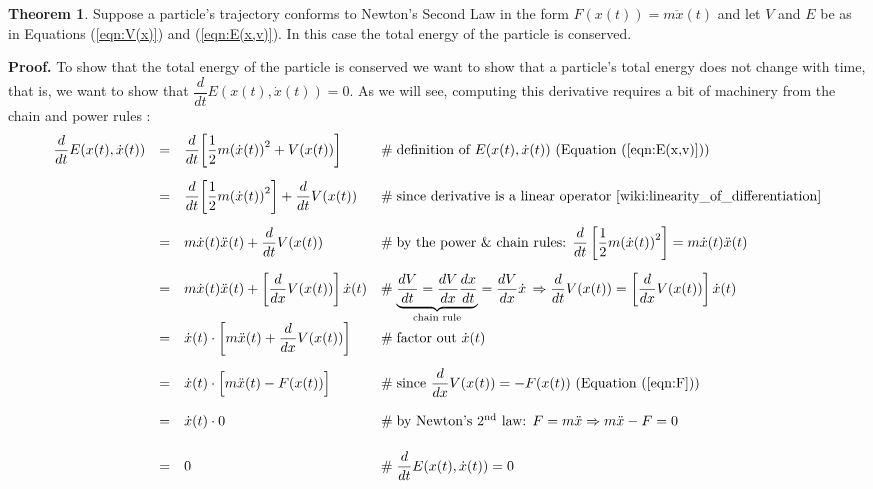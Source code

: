 \documentclass{article}
\theoremstyle{definition}
\newtheorem{theorem}{Theorem}[section]
\begin{document}
\medskip
\begin{theorem}
\label{theorem:conservation_of_energy_in_R1}
Suppose a particle's trajectory conforms to Newton’s Second Law 
in the form $F(x(t)) = m\ddot{x}(t)$ and let $V$ and $E$ be as 
in Equations (\ref{eqn:V(x)}) and (\ref{eqn:E(x,v)}). In this 
case the total energy of the particle is conserved.

\bigskip
\noindent
{\bf Proof.} To show that the total energy of the particle is
conserved we want to show that a particle's total energy does 
not change with time, that is, we want to show that 
$\dfrac{d}{dt}E(x(t),\dot{x}(t)) = 0$. As we will see, computing 
this derivative requires a bit of machinery from the chain and 
power rules \cite{wiki:chain_rule,wiki:power_rule}:
%
%
%
\bigskip
%
%
%
\begin{equation*}
\begin{array}{llll}
\dfrac{d}{dt} E(x(t),\dot{x}(t))
&=& \dfrac{d}{dt} \bigg [\dfrac{1}{2}m{(\dot{x}(t))}^{2} + V(x(t)) \bigg ]	
		&\hspace{0em} \mathrel{\#} \text{definition of $E(x(t),\dot{x}(t))$ 
		                                 (Equation (\ref{eqn:E(x,v)}))} \\	
[15pt]
&=& \dfrac{d}{dt} \bigg [ \dfrac{1}{2}m{(\dot{x}(t))}^{2} \bigg ] + \dfrac{d}{dt} V(x(t))
		&\hspace{0em} \mathrel{\#} \text{since derivative is a linear 
		                                 operator \cite{wiki:linearity_of_differentiation}} \\
[15pt]
&=& m\dot{x}(t)\ddot{x}(t) + \dfrac{d}{dt} V(x(t))
		&\hspace{0em} \mathrel{\#} \text{by the power \& chain rules: $\dfrac{d}{dt} 
										\left [ \dfrac{1}{2}m{(\dot{x}(t))}^{2} \right ] = 
										 m\dot{x}(t)\ddot{x}(t)$}\\
[15pt]
&=& m\dot{x}(t)\ddot{x}(t) + \left [ \dfrac{d}{dx} V(x(t)) \right ] \dot{x}(t)
		&\hspace{0em} \mathrel{\#} \text{$\underbrace{\dfrac{dV}{dt} = 
									     \dfrac{dV}{dx} \dfrac{dx}{dt}}_{\text{chain rule}} =
										 \dfrac{dV}{dx}\dot{x} \, \Rightarrow
										 \dfrac{d}{dt} V (x(t)) = 
										 \left [ \dfrac{d}{dx} V(x(t)) \right ] \dot{x}(t)$} \\
[15pt]
&=& \dot{x}(t) \cdot \left [m \ddot{x}(t) + \dfrac{d}{dx}V(x(t)) \right ]
		&\hspace{0em} \mathrel{\#} \text{factor out $\dot{x}(t)$} \\
[15pt]
&=& \dot{x}(t) \cdot \Big [m \ddot{x}(t) - F(x(t)) \Big ]
		&\hspace{0em} \mathrel{\#} \text{since $\dfrac{d}{dx}V(x(t)) = - F(x(t))$ 
		                                 (Equation (\ref{eqn:F}))} \\
[15pt]
&=& \dot{x}(t) \cdot 0
		&\hspace{0em} \mathrel{\#} \text{by Newton's $2^{\text{nd}}$ law: 
		                                 $F = m\ddot{x} \Rightarrow m\ddot{x} - F = 0$} \\
[15pt]
&=& 0
		&\hspace{0em} \mathrel{\#} \dfrac{d}{dt} E(x(t),\dot{x}(t)) = 0 
\end{array}
\end{equation*}


\end{theorem}
\end{document}
